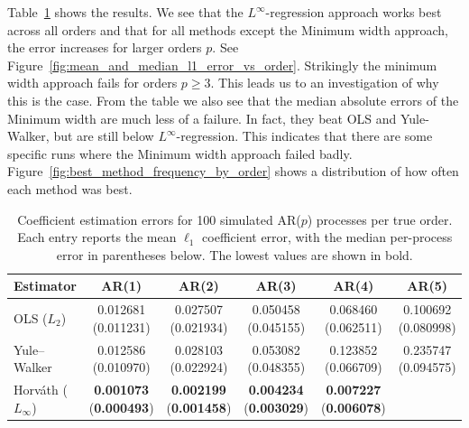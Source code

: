 Table~\ref{tab:ar-coefficient-mae} shows the results. We see that the $L^{\infty}$-regression approach works best across all orders and that for all methods except the Minimum width approach, the error increases for larger orders $p$. See Figure~\ref{fig:mean_and_median_l1_error_vs_order}. Strikingly the minimum width approach fails for orders $p\ge3$. This leads us to an investigation of why this is the case. From the table we also see that the median absolute errors of the Minimum width are much less of a failure. In fact, they beat OLS and Yule-Walker, but are still below $L^{\infty}$-regression. This indicates that there are some specific runs where the Minimum width approach failed badly. Figure~\ref{fig:best_method_frequency_by_order} shows a distribution of how often each method was best.

\begin{table}[htbp]
\centering
\caption{Coefficient estimation errors for 100 simulated AR($p$)
processes per true order. Each entry reports the mean
$\ell_1$ coefficient error, with the median per-process error
in parentheses below. The lowest values are shown in bold.}
\label{tab:ar-coefficient-mae}
\begin{tabular}{lccccc}
\toprule
Estimator & AR(1) & AR(2) & AR(3) & AR(4) & AR(5) \\
\midrule
OLS ($L_2$)
& \shortstack{0.012681 \\ (0.011231)}
& \shortstack{0.027507 \\ (0.021934)}
& \shortstack{0.050458 \\ (0.045155)}
& \shortstack{0.068460 \\ (0.062511)}
& \shortstack{0.100692 \\ (0.080998)} \\
Yule--Walker
& \shortstack{0.012586 \\ (0.010970)}
& \shortstack{0.028103 \\ (0.022924)}
& \shortstack{0.053082 \\ (0.048355)}
& \shortstack{0.123852 \\ (0.066709)}
& \shortstack{0.235747 \\ (0.094575)} \\
Horváth ($L_{\infty}$)
& \shortstack{\textbf{0.001073} \\ (\textbf{0.000493})}
& \shortstack{\textbf{0.002199} \\ (\textbf{0.001458})}
& \shortstack{\textbf{0.004234} \\ (\textbf{0.003029})}
& \shortstack{\textbf{0.007227} \\ (\textbf{0.006078})}

\end{tabular}
\end{table}
